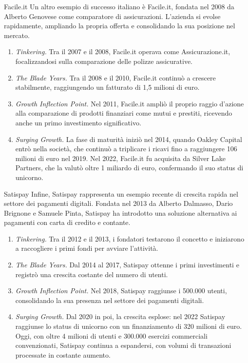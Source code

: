 \begin{Example}{Facile.it}{}
Un altro esempio di successo italiano è Facile.it, fondata nel 2008 da Alberto Genovese come comparatore di assicurazioni. L’azienda si evolse rapidamente, ampliando la propria offerta e consolidando la sua posizione nel mercato.
\begin{enumerate}
    \item \textit{Tinkering.} Tra il 2007 e il 2008, Facile.it operava come Assicurazione.it, focalizzandosi sulla comparazione delle polizze assicurative.
    \item \textit{The Blade Years.} Tra il 2008 e il 2010, Facile.it continuò a crescere stabilmente, raggiungendo un fatturato di 1,5 milioni di euro.
    \item \textit{Growth Inflection Point.} Nel 2011, Facile.it ampliò il proprio raggio d’azione alla comparazione di prodotti finanziari come mutui e prestiti, ricevendo anche un primo investimento significativo.
    \item \textit{Surging Growth.} La fase di maturità iniziò nel 2014, quando Oakley Capital entrò nella società, che continuò a triplicare i ricavi fino a raggiungere 106 milioni di euro nel 2019. Nel 2022, Facile.it fu acquisita da Silver Lake Partners, che la valutò oltre 1 miliardo di euro, confermando il suo status di unicorno.
\end{enumerate}
\end{Example}

\begin{Example}{Satispay}{}
Infine, Satispay rappresenta un esempio recente di crescita rapida nel settore dei pagamenti digitali. Fondata nel 2013 da Alberto Dalmasso, Dario Brignone e Samuele Pinta, Satispay ha introdotto una soluzione alternativa ai pagamenti con carta di credito e contante.
\begin{enumerate}
    \item \textit{Tinkering.} Tra il 2012 e il 2013, i fondatori testarono il concetto e iniziarono a raccogliere i primi fondi per avviare l’attività.
    \item \textit{The Blade Years.} Dal 2014 al 2017, Satispay ottenne i primi investimenti e registrò una crescita costante del numero di utenti.
    \item \textit{Growth Inflection Point.} Nel 2018, Satispay raggiunse i 500.000 utenti, consolidando la sua presenza nel settore dei pagamenti digitali.
    \item \textit{Surging Growth.} Dal 2020 in poi, la crescita esplose: nel 2022 Satispay raggiunse lo status di unicorno con un finanziamento di 320 milioni di euro. Oggi, con oltre 4 milioni di utenti e 300.000 esercizi commerciali convenzionati, Satispay continua a espandersi, con volumi di transazioni processate in costante aumento.
\end{enumerate}
\end{Example}

